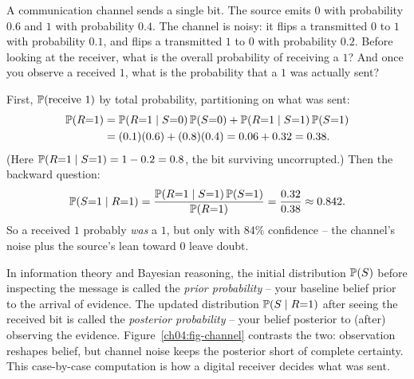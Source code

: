 \begin{example}
\label{ch04:ex-channel}
A communication channel sends a single bit. The source emits $0$ with probability $0.6$ and $1$ with probability $0.4$. The channel is noisy: it flips a transmitted $0$ to $1$ with probability $0.1$, and flips a transmitted $1$ to $0$ with probability $0.2$. Before looking at the receiver, what is the overall probability of receiving a $1$? And once you observe a received $1$, what is the probability that a $1$ was actually sent?

First, $\P(\text{receive }1)$ by total probability, partitioning on what was sent:
\[
\begin{aligned}
\P(R{=}1) &= \P(R{=}1\given S{=}0)\P(S{=}0) + \P(R{=}1\given S{=}1)\P(S{=}1) \\
&= (0.1)(0.6) + (0.8)(0.4) = 0.06 + 0.32 = 0.38.
\end{aligned}
\]
(Here $\P(R{=}1\given S{=}1) = 1 - 0.2 = 0.8$, the bit surviving uncorrupted.) Then the backward question:
\[
\P(S{=}1 \given R{=}1) = \frac{\P(R{=}1\given S{=}1)\P(S{=}1)}{\P(R{=}1)} = \frac{0.32}{0.38} \approx 0.842.
\]
So a received $1$ probably \emph{was} a $1$, but only with $84\%$ confidence -- the channel's noise plus the source's lean toward $0$ leave doubt.

In information theory and Bayesian reasoning, the initial distribution $\P(S)$ before inspecting the message is called the \emph{prior probability} -- your baseline belief prior to the arrival of evidence. The updated distribution $\P(S \given R{=}1)$ after seeing the received bit is called the \emph{posterior probability} -- your belief posterior to (after) observing the evidence. Figure~\ref{ch04:fig-channel} contrasts the two: observation reshapes belief, but channel noise keeps the posterior short of complete certainty. This case-by-case computation is how a digital receiver decides what was sent.
\end{example}

